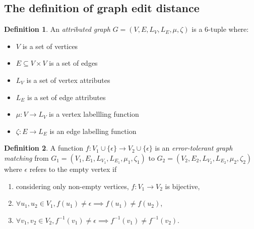 \documentclass{article}
\theoremstyle{definition}
\newtheorem{definition}{Definition}
\begin{document}
\subsection{The definition of graph edit distance}
\begin{definition}
  An \emph{attributed graph} $G = (V, E, L_V, L_E, \mu, \zeta)$ is a 6-tuple where:
  \begin{itemize}
  \item $V$ is a set of vertices
  \item $E \subseteq V \times V$ is a set of edges
  \item $L_V$ is a set of vertex attributes
  \item $L_E$ is a set of edge attributes
  \item $\mu : V \to L_V$ is a vertex labellling function
  \item $\zeta : E \to L_E$ is an edge labelling function
  \end{itemize}
\end{definition}
\begin{definition}
  A function $f: V_1 \cup \{ \epsilon \} \to V_2 \cup \{ \epsilon \}$ is an \emph{error-tolerant graph matching} from $G_1 = (V_1, E_1, L_{V_1}, L_{E_1}, \mu_1, \zeta_1)$ to $G_2 = (V_2, E_2, L_{V_2}, L_{E_2}, \mu_2, \zeta_2)$ where $\epsilon$ refers to the empty vertex if
  \begin{enumerate}
  \item considering only non-empty vertices, $f: V_1 \to V_2$ is bijective,
  \item $\forall u_1, u_2 \in V_1, f(u_1) \ne \epsilon \implies f(u_1) \ne f(u_2)$,
  \item $\forall v_1, v_2 \in V_2, f^{-1}(v_1) \ne \epsilon \implies f^{-1}(v_1) \ne f^{-1}(v_2)$.
  \end{enumerate}
\end{definition}
\end{document}
